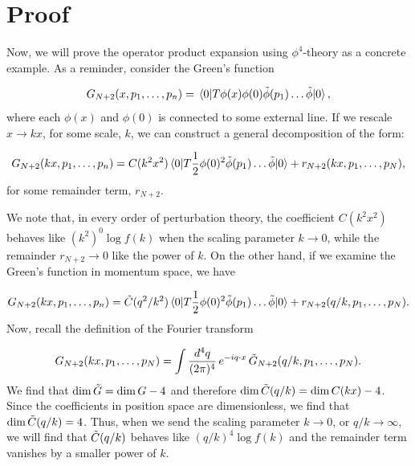 \documentclass{scrartcl}
\begin{document}
\section{Proof}

Now, we will prove the operator product expansion using $\phi^4$-theory as a concrete example. As a reminder, consider the Green's function

\begin{equation}
    G_{N+2}(x, p_1,\dots, p_n) = \mel{0}{T\phi(x)\phi(0)\Tilde{\phi}(p_1)\dots\Tilde{\phi}}{0},
\end{equation}
where each $\phi(x)$ and $\phi(0)$ is connected to some external line. If we rescale $x \rightarrow kx$, for some scale, $k$, we can construct a general decomposition of the form:

\begin{equation}
    G_{N+2}(kx, p_1,\dots, p_n) = C(k^2x^2)\mel{0}{T\frac{1}{2}\phi(0)^2\Tilde{\phi}(p_1)\dots\Tilde{\phi}}{0} + r_{N+2}(kx,p_1,\dots,p_N),
    \label{green's decomposed}
\end{equation}
for some remainder term, $r_{N+2}$.     

We note that, in every order of perturbation theory, the coefficient $C(k^2x^2)$ behaves like $(k^2)^0\log f(k)$ when the scaling parameter $k\rightarrow 0$, while the remainder $r_{N+2}\rightarrow0$ like the power of $k$. On the other hand, if we examine the Green's function in momentum space, we have 

\begin{equation}
    G_{N+2}(kx, p_1,\dots, p_n) = \Tilde{C}(q^2/k^2)\mel{0}{T\frac{1}{2}\phi(0)^2\Tilde{\phi}(p_1)\dots\Tilde{\phi}}{0} + r_{N+2}(q/k,p_1,\dots,p_N).
    \label{green with remainder}
\end{equation}
Now, recall the definition of the Fourier transform

\begin{equation}
    G_{N+2}(kx,p_1,\dots,p_N) = \int \frac{d^4q}{(2\pi)^4} \, e^{-iq\cdot x} \, \Tilde{G}_{N+2}(q/k,p_1,\dots,p_N).
    \label{green with remainder in momentum}
\end{equation}
We find that $\mathrm{dim}\,\Tilde{G} = \mathrm{dim}\,G-4$ and therefore $\mathrm{dim}\,\Tilde{C}(q/k) = \mathrm{dim}\,C(kx)-4$. Since the coefficients in position space are dimensionless, we find that $\mathrm{dim}\,\Tilde{C}(q/k)=4$. Thus, when we send the scaling parameter $k\rightarrow 0$, or $q/k \rightarrow \infty$, we will find that $\Tilde{C}(q/k)$ behaves like $(q/k)^4 \log f(k) $ and the remainder term vanishes by a smaller power of $k$. 
\end{document}
